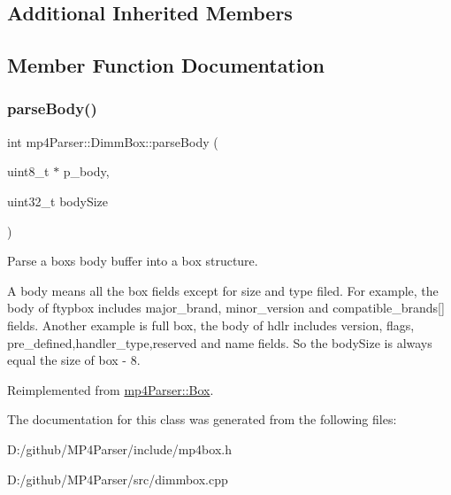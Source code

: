 \subsection*{Additional Inherited Members}


\subsection{Member Function Documentation}
\mbox{\label{classmp4_parser_1_1_dimm_box_a9504de9dd02507dc834e7481a0e4cff1}} 
\subsubsection{\texorpdfstring{parseBody()}{parseBody()}}
{\footnotesize\ttfamily int mp4\+Parser\+::\+Dimm\+Box\+::parse\+Body (\begin{DoxyParamCaption}\item[{uint8\+\_\+t $\ast$}]{p\+\_\+body,  }\item[{uint32\+\_\+t}]{body\+Size }\end{DoxyParamCaption})\hspace{0.3cm}{\ttfamily [virtual]}}



Parse a box\textquotesingle{}s body buffer into a box structure. 

A body means all the box fields except for size and type filed. For example, the body of ftypbox includes major\+\_\+brand, minor\+\_\+version and compatible\+\_\+brands\mbox{[}\mbox{]} fields. Another example is full box, the body of hdlr includes version, flags, pre\+\_\+defined,handler\+\_\+type,reserved and name fields. So the body\+Size is always equal the size of box -\/ 8. 

Reimplemented from \mbox{\hyperlink{classmp4_parser_1_1_box_a3dd0c084ac65bc77b69ac5ecaf796cb2}{mp4\+Parser\+::\+Box}}.



The documentation for this class was generated from the following files\+:\begin{DoxyCompactItemize}
\item 
D\+:/github/\+M\+P4\+Parser/include/mp4box.\+h\item 
D\+:/github/\+M\+P4\+Parser/src/dimmbox.\+cpp\end{DoxyCompactItemize}
